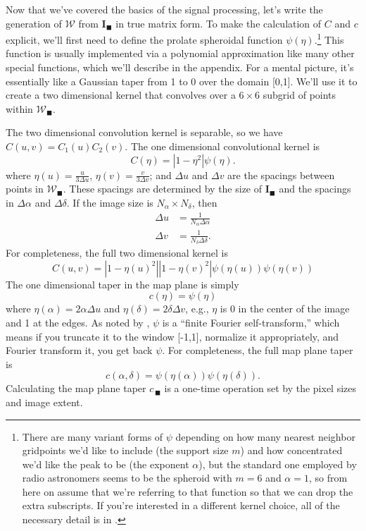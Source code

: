 \documentclass[modern]{aastex62}
\newcommand{\im}{\boldsymbol{I}_\blacksquare}
\newcommand{\vm}{\boldsymbol{\mathcal{W}}} %
\newcommand{\ct}{c_{\,\blacksquare}}
\begin{document}
Now that we've covered the basics of the signal processing, let's write the generation of $\vm$ from $\im$ in true matrix form. To make the calculation of $C$ and $c$ explicit, we'll first need to define the prolate spheroidal function $\psi(\eta)$.\footnote{There are many variant forms of $\psi$ depending on how many nearest neighbor gridpoints we'd like to include (the support size $m$) and how concentrated we'd like the peak to be (the exponent $\alpha$), but the standard one employed by radio astronomers seems to be the spheroid with $m = 6$ and $\alpha = 1$, so from here on assume that we're referring to that function so that we can drop the extra subscripts. If you're interested in a different kernel choice, all of the necessary detail is in \citet{schwab84}.} This function is usually implemented via a polynomial approximation like many other special functions, which we'll describe in the appendix. For a mental picture, it's essentially like a Gaussian taper from 1 to 0 over the domain [0,1]. We'll use it to create a two dimensional kernel that convolves over a $6 \times 6$ subgrid of points within $\vm_\blacksquare$.

The two dimensional convolution kernel is separable, so we have $C(u,v) = C_1(u)C_2(v)$. The one dimensional convolutional kernel is 
\begin{equation}
    C(\eta) = |1 - \eta^2| \psi(\eta).
\end{equation}
where $\eta(u) = \frac{u}{3 \Delta u}$, $\eta(v) = \frac{v}{3 \Delta v}$; and $\Delta u$ and $\Delta v$ are the spacings between points in $\vm_\blacksquare$. These spacings are determined by the size of $\im$ and the spacings in $\Delta \alpha$ and $\Delta \delta$. If the image size is $N_\alpha \times N_\delta$, then
\begin{eqnarray}
    \Delta u &= \frac{1}{N_\alpha \Delta \alpha}\\
    \Delta v &= \frac{1}{N_\delta \Delta \delta}.
\end{eqnarray}
For completeness, the full two dimensional kernel is
\begin{equation}
    C(u,v) = |1 - \eta(u)^2| |1 - \eta(v)^2| \psi(\eta(u)) \psi(\eta(v)) 
\end{equation}
The one dimensional taper in the map plane is simply 
\begin{equation}
    c(\eta) = \psi(\eta)
\end{equation}
where $\eta(\alpha) = 2 \alpha \Delta u$ and  $\eta(\delta) = 2 \delta \Delta v$, e.g., $\eta$ is 0 in the center of the image and 1 at the edges. As noted by \citet{synthesis99}, $\psi$ is a ``finite Fourier self-transform,'' which means if you truncate it to the window [-1,1], normalize it appropriately, and Fourier transform it, you get back $\psi$. For completeness, the full map plane taper is 
\begin{equation}
    c(\alpha, \delta) = \psi(\eta(\alpha)) \psi(\eta(\delta)).
\end{equation}
Calculating the map plane taper $\ct$ is a one-time operation set by the pixel sizes and image extent. 
\end{document}
